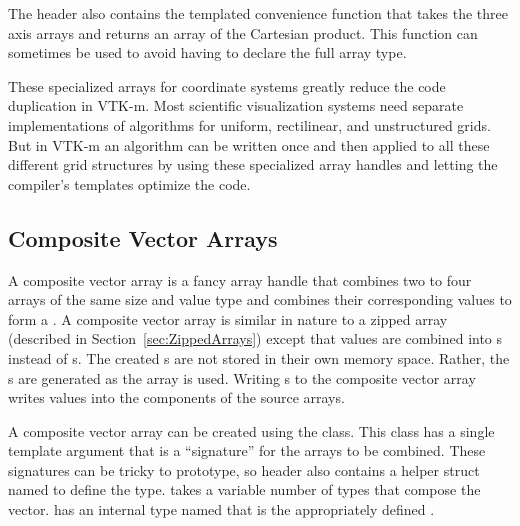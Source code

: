 
The  header also
contains the templated convenience function
 that takes the three axis
arrays and returns an array of the Cartesian product. This function can
sometimes be used to avoid having to declare the full array type.



\begin{didyouknow}
  These specialized arrays for coordinate systems greatly reduce the code
  duplication in VTK-m. Most scientific visualization systems need separate
  implementations of algorithms for uniform, rectilinear, and unstructured
  grids. But in VTK-m an algorithm can be written once and then applied to
  all these different grid structures by using these specialized array
  handles and letting the compiler's templates optimize the code.
\end{didyouknow}

\subsection{Composite Vector Arrays}
\label{sec:CompositeVectorArrays}


A composite vector array is a fancy array handle that combines two to four
arrays of the same size and value type and combines their corresponding
values to form a . A composite vector array is similar in nature
to a zipped array (described in Section~\ref{sec:ZippedArrays}) except that
values are combined into s instead of s. The created
s are not stored in their own memory space. Rather, the
s are generated as the array is used. Writing
s to the composite vector array writes values into the
components of the source arrays.

A composite vector array can be created using the
 class. This class has a single
template argument that is a ``signature'' for the arrays to be combined.
These signatures can be tricky to prototype, so
 header also contains a
helper struct named  to define the
type.  takes a variable
number of  types that compose the vector.
 has an internal type named
 that is the appropriately defined
.

